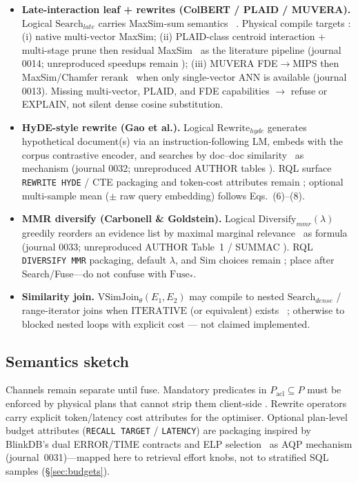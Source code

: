 \begin{itemize}
  \item \textbf{Late-interaction leaf + rewrites (ColBERT / PLAID / MUVERA).}
    Logical $\mathrm{Search}_{late}$ carries MaxSim-sum semantics~\citep{khattab2020colbert} \established{}.
    Physical compile targets \hypothesis{}: (i) native multi-vector MaxSim; (ii) PLAID-class centroid interaction + multi-stage prune then residual MaxSim~\citep{santhanam2022plaid} \established{} as the literature pipeline (journal 0014; unreproduced speedups remain \provisional{}); (iii) MUVERA FDE$\rightarrow$MIPS then MaxSim/Chamfer rerank~\citep{jayaram2024muvera} when only single-vector ANN is available (journal 0013).
    Missing multi-vector, PLAID, and FDE capabilities $\rightarrow$ refuse or EXPLAIN, not silent dense cosine substitution.
  \item \textbf{HyDE-style rewrite (Gao et al.).}
    Logical $\mathrm{Rewrite}_{hyde}$ generates hypothetical document(s) via an instruction-following LM, embeds with the corpus contrastive encoder, and searches by doc--doc similarity~\citep{gao2023hyde} \established{} as mechanism (journal 0032; unreproduced AUTHOR tables \provisional{}).
    RQL surface \texttt{REWRITE HYDE} / CTE packaging and token-cost attributes remain \hypothesis{}; optional multi-sample mean ($\pm$ raw query embedding) follows Eqs.~(6)--(8).
  \item \textbf{MMR diversify (Carbonell \& Goldstein).}
    Logical $\mathrm{Diversify}_{mmr}(\lambda)$ greedily reorders an evidence list by maximal marginal relevance~\citep{carbonell1998mmr} \established{} as formula (journal 0033; unreproduced AUTHOR Table~1 / SUMMAC \provisional{}).
    RQL \texttt{DIVERSIFY MMR} packaging, default $\lambda$, and Sim choices remain \hypothesis{}; place after Search/Fuse---do not confuse with $\mathrm{Fuse}_{*}$.
  \item \textbf{Similarity join.}
    $\mathrm{VSimJoin}_{\theta}(E_1,E_2)$ may compile to nested $\mathrm{Search}_{dense}$ / range-iterator joins when $\mathrm{ITERATIVE}$ (or equivalent) exists~\citep{zhang2023vbase} \hypothesis{}; otherwise to blocked nested loops with explicit cost --- not claimed implemented.
\end{itemize}

\subsection{Semantics sketch}
Channels remain separate until fuse.
Mandatory predicates in $P_{\mathrm{acl}}\subseteq P$ must be enforced by physical plans that cannot strip them client-side \hypothesis{}.
Rewrite operators carry explicit token/latency cost attributes for the optimiser.
Optional plan-level budget attributes (\texttt{RECALL TARGET} / \texttt{LATENCY}) are \hypothesis{} packaging inspired by BlinkDB's dual ERROR/TIME contracts and ELP selection~\citep{agarwal2013blinkdb} \established{} as AQP mechanism (journal~0031)---mapped here to retrieval effort knobs, not to stratified SQL samples (\S\ref{sec:budgets}).

